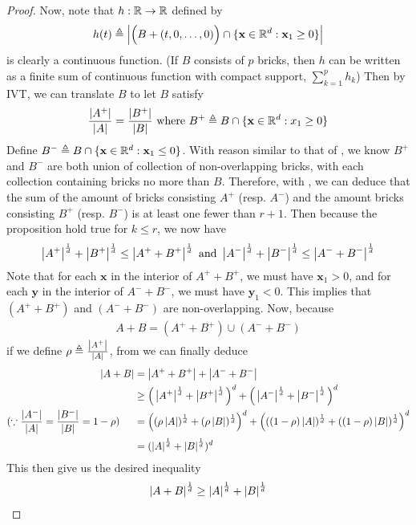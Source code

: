 \documentclass{report}
\begin{document}
\begin{proof}
Now, note that $h:\mathbb{R}\rightarrow \mathbb{R}$ defined by
\begin{align*}
h(t)\triangleq  \left|\Big(B+(t,0,\dots ,0) \Big)\cap \{ \textbf{x}\in\mathbb{R}^d: \textbf{x}_1\geq 0 \}\right|
\end{align*}
is clearly a continuous function. (If $B$ consists of  $p$ bricks, then  $h$ can be written as a finite sum of continuous function with compact support, $\sum_{k=1}^p h_k$) Then by IVT, we can translate $B$ to let $B$ satisfy 
 \begin{align}
  \label{rai}
\frac{\left|A^+\right|}{\left|A\right|}= \frac{\left|B^+\right|}{\left|B\right|}\text{ where }B^+ \triangleq B \cap \{ \textbf{x}\in\mathbb{R}^d: x_1\geq 0 \}
\end{align}
Define $B^-\triangleq B\cap \{ \textbf{x}\in\mathbb{R}^d:\textbf{x}_1\leq 0 \}$. With reason similar to that of , we know $B^+$ and  $B^-$ are both union of collection of non-overlapping bricks, with each collection containing bricks no more than  $B$. Therefore, with , we can deduce that the sum of the amount of bricks consisting $A^+$ (resp. $A^-$) and the amount bricks consisting $B^+$ (resp. $B^-$) is at least one fewer than $r+1$. Then because the proposition hold true for $k\leq r$, we now have
\begin{align*}
\left|A^+\right|^{\frac{1}{d}}+ \left|B^+\right|^{\frac{1}{d}}\leq \left|A^++B^+\right|^{\frac{1}{d}}\text{ and }\left|A^-\right|^{\frac{1}{d}}+ \left|B^-\right|^{\frac{1}{d}}\leq \left|A^-+B^-\right|^{\frac{1}{d}}
\end{align*}
Note that for each $\textbf{x}$ in the interior of $A^++B^+$, we must have  $\textbf{x}_1>0$, and for each  $\textbf{y}$ in the interior of $A^-+B^-$, we must have  $\textbf{y}_1<0$. This implies that  $(A^++B^+)$ and $(A^-+B^-)$ are non-overlapping. Now, because 
\begin{align*}
A+B =(A^++B^+)\cup (A^-+B^-)
\end{align*}
if we define $\rho \triangleq \frac{\left|A^+\right|}{\left|A\right|}$, from  we can finally deduce 
\begin{align*}
\left|A+B\right|&= \left|A^++B^+\right|+ \left|A^-+B^-\right|\\
&\geq \Big(\left|A^+\right|^{\frac{1}{d}} + \left|B^+\right|^{\frac{1}{d}} \Big)^{d} + \Big(\left|A^-\right|^{\frac{1}{d}}+\left|B^-\right|^{\frac{1}{d}}  \Big)^d \\ 
(\because \frac{\left|A^-\right|}{\left|A\right|}=\frac{\left|B^-\right|}{\left|B\right|}=1-\rho)\hspace{0.5cm}&=\Big((\rho \left|A\right|)^{\frac{1}{d}}+ (\rho \left|B\right|)^{\frac{1}{d}} \Big)^d + \Big(((1-\rho)\left|A\right|)^{\frac{1}{d}}+ ((1-\rho)\left|B\right|)^{\frac{1}{d}} \Big)^d \\
&=(\left|A\right|^{\frac{1}{d}}+\left|B\right|^{\frac{1}{d}})^d
\end{align*}
This then give us the desired inequality  
\begin{align*}
\left|A+B\right|^{\frac{1}{d}}\geq \left|A\right|^{\frac{1}{d}}+ \left|B\right|^{\frac{1}{d}}
\end{align*}
\end{proof}
\end{document}

